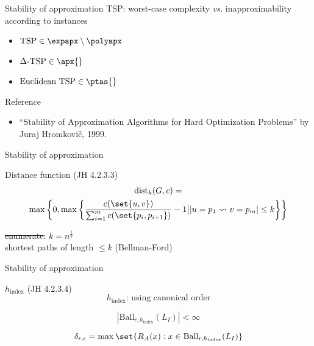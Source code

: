 
\begin{frame}{Stability of approximation}
  TSP: worst-case complexity \emph{vs.} inapproximability according to instances

  \begin{itemize}
	\item $\text{TSP} \in \expapx \setminus \polyapx$
	\item $\Delta\text{-TSP} \in \apx{}$
	\item $\text{Euclidean TSP} \in \ptas{}$
  \end{itemize}

  \begin{alertblock}{Reference}
	\begin{itemize}
	  \item ``Stability of Approximation Algorithms for Hard Optimization Problems'' by Juraj Hromkovi\v{c}, 1999.
	\end{itemize}
  \end{alertblock}
\end{frame}

\begin{frame}{Stability of approximation}
  \begin{exampleblock}{Distance function (JH 4.2.3.3)}
	\begin{gather*}
	  \text{dist}_{k}(G,c) = \\
	  \max\left\{0, \max\left\{ \frac{c(\set{u,v})}{\sum_{i=1}^{m} c(\set{p_i, p_{i+1}})} - 1 \bigl \lvert |u = p_1 \leadsto v = p_m| \le k \right\}\right\}
	\end{gather*}
  \end{exampleblock}

  \begin{center}
	\sout{enumerate}: $k = n^{\frac{1}{3}}$ \\[5pt]
    shortest paths of length $\le k$ (Bellman-Ford)
  \end{center}
\end{frame}

\begin{frame}{Stability of approximation}
  \begin{exampleblock}{$h_{\text{index}}$ (JH 4.2.3.4)}
	\[
	  h_{\text{index}}\text{: using canonical order}
	\]
  \end{exampleblock}

  \[
	|\text{Ball}_{r, h_{\text{index}}}(L_I)| < \infty
  \]

  \[
	\delta_{r, \epsilon} = \max \set{R_A(x): x \in \text{Ball}_{r, h_{\text{index}}}(L_I)}
  \]
\end{frame}

